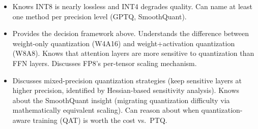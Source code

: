 \begin{interviewq}
\goodgreat
\begin{itemize}
    \item {} Knows INT8 is nearly lossless and INT4 degrades quality. Can name at least one method per precision level (GPTQ, SmoothQuant).
    \item {} Provides the decision framework above. Understands the difference between weight-only quantization (W4A16) and weight+activation quantization (W8A8). Knows that attention layers are more sensitive to quantization than FFN layers. Discusses FP8's per-tensor scaling mechanism.
    \item {} Discusses mixed-precision quantization strategies (keep sensitive layers at higher precision, identified by Hessian-based sensitivity analysis). Knows about the SmoothQuant insight (migrating quantization difficulty via mathematically equivalent scaling). Can reason about when quantization-aware training (QAT) is worth the cost vs.\ PTQ.
\end{itemize}

\end{interviewq}


